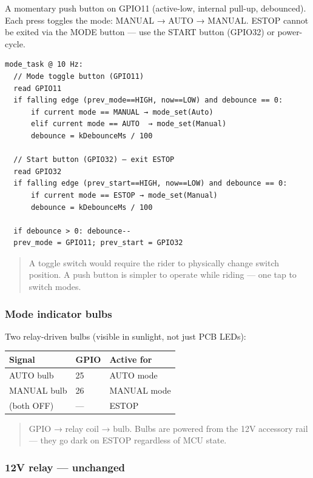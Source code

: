 \documentclass[12pt,a4paper,oneside]{report}
\begin{document}
A momentary push button on GPIO11 (active-low, internal pull-up, debounced).
Each press toggles the mode: MANUAL → AUTO → MANUAL. ESTOP cannot be exited via
the MODE button --- use the START button (GPIO32) or power-cycle.

\begin{verbatim}
mode_task @ 10 Hz:
  // Mode toggle button (GPIO11)
  read GPIO11
  if falling edge (prev_mode==HIGH, now==LOW) and debounce == 0:
      if current mode == MANUAL → mode_set(Auto)
      elif current mode == AUTO  → mode_set(Manual)
      debounce = kDebounceMs / 100

  // Start button (GPIO32) — exit ESTOP
  read GPIO32
  if falling edge (prev_start==HIGH, now==LOW) and debounce == 0:
      if current mode == ESTOP → mode_set(Manual)
      debounce = kDebounceMs / 100

  if debounce > 0: debounce--
  prev_mode = GPIO11; prev_start = GPIO32
\end{verbatim}

\begin{quote}
A toggle switch would require the rider to physically change switch position. A
push button is simpler to operate while riding --- one tap to switch modes.
\end{quote}

\subsubsection{Mode indicator bulbs}\label{mode-indicator-bulbs}

Two relay-driven bulbs (visible in sunlight, not just PCB LEDs):

\begin{longtable}[]{@{}lll@{}}
\toprule\noalign{}
Signal & GPIO & Active for \\
\midrule\noalign{}
\endhead
\bottomrule\noalign{}
\endlastfoot
AUTO bulb & 25 & AUTO mode \\
MANUAL bulb & 26 & MANUAL mode \\
(both OFF) & --- & ESTOP \\
\end{longtable}

\begin{quote}
GPIO → relay coil → bulb. Bulbs are powered from the 12V accessory rail --- they
go dark on ESTOP regardless of MCU state.
\end{quote}

\subsubsection{12V relay --- unchanged}\label{v-relay-unchanged}
\end{document}
